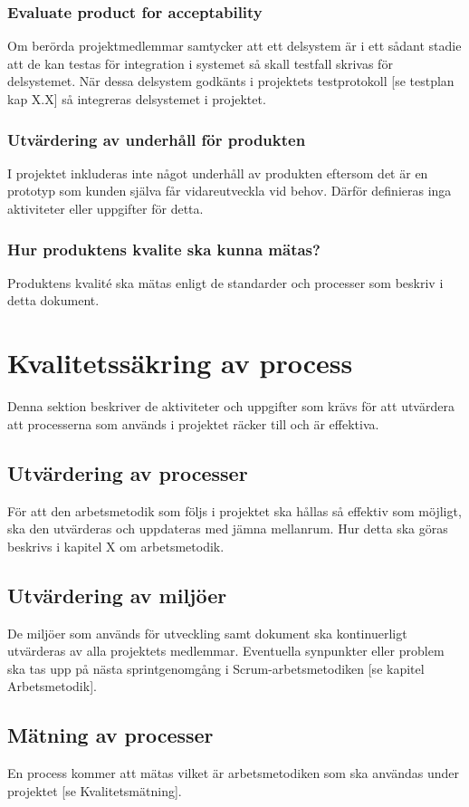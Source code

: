 \documentclass[a4paper,10pt]{article}
\begin{document}
\subsubsection{Evaluate product for acceptability}
Om berörda projektmedlemmar samtycker att ett delsystem är i ett sådant stadie att de kan testas för integration i systemet så skall testfall skrivas för delsystemet. När dessa delsystem godkänts i projektets testprotokoll [se testplan kap X.X] så integreras delsystemet i projektet.
\subsubsection{Utvärdering av underhåll för produkten}
I projektet inkluderas inte något underhåll av produkten eftersom det är en prototyp som kunden själva får vidareutveckla vid behov. Därför definieras inga aktiviteter eller uppgifter för detta.
\subsubsection{Hur produktens kvalite ska kunna mätas?}
Produktens kvalité ska mätas enligt de standarder och processer som beskriv i detta dokument.
\section{Kvalitetssäkring av process}
Denna sektion beskriver de aktiviteter och uppgifter som krävs för att utvärdera att processerna som används i projektet räcker till och är effektiva.

\subsection{Utvärdering av processer}

För att den arbetsmetodik som följs i projektet ska hållas så effektiv som möjligt, ska den utvärderas och uppdateras med jämna mellanrum. Hur detta ska göras beskrivs i kapitel X om arbetsmetodik.

\subsection{Utvärdering av miljöer}
De miljöer som används för utveckling samt dokument ska kontinuerligt utvärderas av alla projektets medlemmar. Eventuella synpunkter eller problem ska tas upp på nästa sprintgenomgång i Scrum-arbetsmetodiken [se kapitel Arbetsmetodik].

\subsection{Mätning av processer}
En process kommer att mätas vilket är arbetsmetodiken som ska användas under projektet [se Kvalitetsmätning].
\end{document}
